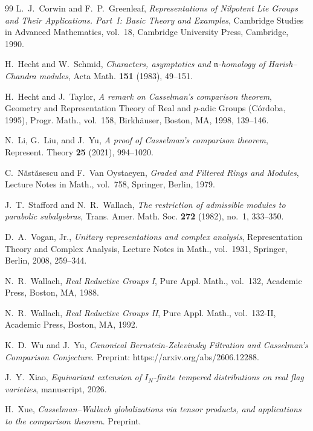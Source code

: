 \documentclass[a4paper,12pt]{amsart}
\numberwithin{equation}{section}
\theoremstyle{plain}
\theoremstyle{definition}
\theoremstyle{remark}
\begin{document}
\begin{thebibliography}{99}
L.~J.~Corwin and F.~P.~Greenleaf, \emph{Representations of Nilpotent Lie Groups and Their Applications. Part~I: Basic Theory and Examples}, Cambridge Studies in Advanced Mathematics, vol.~18, Cambridge University Press, Cambridge, 1990.

H.~Hecht and W.~Schmid, \emph{Characters, asymptotics and $\mathfrak n$-homology of Harish--Chandra modules}, Acta Math. \textbf{151} (1983), 49--151.

H.~Hecht and J.~Taylor, \emph{A remark on Casselman's comparison theorem}, Geometry and Representation Theory of Real and $p$-adic Groups (C\'ordoba, 1995), Progr. Math., vol.~158, Birkh\"auser, Boston, MA, 1998, 139--146.

N.~Li, G.~Liu, and J.~Yu, \emph{A proof of Casselman's comparison theorem}, Represent. Theory \textbf{25} (2021), 994--1020.

C.~N\u{a}st\u{a}sescu and F.~Van Oystaeyen, \emph{Graded and Filtered Rings and Modules}, Lecture Notes in Math., vol.~758, Springer, Berlin, 1979.

J.~T.~Stafford and N.~R.~Wallach, \emph{The restriction of admissible modules to parabolic subalgebras}, Trans. Amer. Math. Soc. \textbf{272} (1982), no.~1, 333--350.

D.~A.~Vogan, Jr., \emph{Unitary representations and complex analysis}, Representation Theory and Complex Analysis, Lecture Notes in Math., vol.~1931, Springer, Berlin, 2008, 259--344.

N.~R.~Wallach, \emph{Real Reductive Groups I}, Pure Appl. Math., vol.~132, Academic Press, Boston, MA, 1988.

N.~R.~Wallach, \emph{Real Reductive Groups II}, Pure Appl. Math., vol.~132-II, Academic Press, Boston, MA, 1992.

K.~D.~Wu and J.~Yu, \emph{Canonical Bernstein-Zelevinsky Filtration and Casselman's Comparison Conjecture}. Preprint: https://arxiv.org/abs/2606.12288. 

J.~Y.~Xiao, \emph{Equivariant extension of $I_N$-finite tempered distributions on real flag varieties}, manuscript, 2026.

H.~Xue, \emph{Casselman--Wallach globalizations via tensor products, and applications to the comparison theorem}.
Preprint.
\end{thebibliography}
\end{document}
